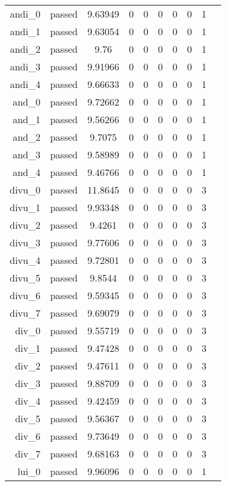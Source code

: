 \begin{longtable}{r|ccccccccc}
    andi\_0 & passed & 9.63949 & 0 & 0 & 0 & 0 & 0 & 1 \\
    andi\_1 & passed & 9.63054 & 0 & 0 & 0 & 0 & 0 & 1 \\
    andi\_2 & passed & 9.76 & 0 & 0 & 0 & 0 & 0 & 1 \\
    andi\_3 & passed & 9.91966 & 0 & 0 & 0 & 0 & 0 & 1 \\
    andi\_4 & passed & 9.66633 & 0 & 0 & 0 & 0 & 0 & 1 \\
    and\_0 & passed & 9.72662 & 0 & 0 & 0 & 0 & 0 & 1 \\
    and\_1 & passed & 9.56266 & 0 & 0 & 0 & 0 & 0 & 1 \\
    and\_2 & passed & 9.7075 & 0 & 0 & 0 & 0 & 0 & 1 \\
    and\_3 & passed & 9.58989 & 0 & 0 & 0 & 0 & 0 & 1 \\
    and\_4 & passed & 9.46766 & 0 & 0 & 0 & 0 & 0 & 1 \\
    divu\_0 & passed & 11.8645 & 0 & 0 & 0 & 0 & 0 & 3 \\
    divu\_1 & passed & 9.93348 & 0 & 0 & 0 & 0 & 0 & 3 \\
    divu\_2 & passed & 9.4261 & 0 & 0 & 0 & 0 & 0 & 3 \\
    divu\_3 & passed & 9.77606 & 0 & 0 & 0 & 0 & 0 & 3 \\
    divu\_4 & passed & 9.72801 & 0 & 0 & 0 & 0 & 0 & 3 \\
    divu\_5 & passed & 9.8544 & 0 & 0 & 0 & 0 & 0 & 3 \\
    divu\_6 & passed & 9.59345 & 0 & 0 & 0 & 0 & 0 & 3 \\
    divu\_7 & passed & 9.69079 & 0 & 0 & 0 & 0 & 0 & 3 \\
    div\_0 & passed & 9.55719 & 0 & 0 & 0 & 0 & 0 & 3 \\
    div\_1 & passed & 9.47428 & 0 & 0 & 0 & 0 & 0 & 3 \\
    div\_2 & passed & 9.47611 & 0 & 0 & 0 & 0 & 0 & 3 \\
    div\_3 & passed & 9.88709 & 0 & 0 & 0 & 0 & 0 & 3 \\
    div\_4 & passed & 9.42459 & 0 & 0 & 0 & 0 & 0 & 3 \\
    div\_5 & passed & 9.56367 & 0 & 0 & 0 & 0 & 0 & 3 \\
    div\_6 & passed & 9.73649 & 0 & 0 & 0 & 0 & 0 & 3 \\
    div\_7 & passed & 9.68163 & 0 & 0 & 0 & 0 & 0 & 3 \\
    lui\_0 & passed & 9.96096 & 0 & 0 & 0 & 0 & 0 & 1 \\

\end{longtable}

